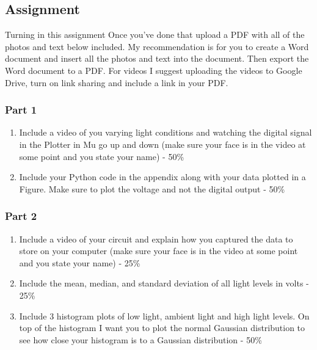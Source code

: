 \subsection{Assignment}

Turning in this assignment
Once you've done that upload a PDF with all of the photos and text below included. My recommendation is for you to create a Word document and insert all the photos and text into the document. Then export the Word document to a PDF. For videos I suggest uploading the videos to Google Drive, turn on link sharing and include a link in your PDF.

\subsubsection{Part 1}
\begin{enumerate}[itemsep=-5pt]
\item Include a video of you varying light conditions and watching the digital signal in the Plotter in Mu go up and down (make sure your face is in the video at some point and you state your name) - 50\%
\item Include your Python code in the appendix along with your data plotted in a Figure. Make sure to plot the voltage and not the digital output - 50\%
\end{enumerate}

\subsubsection{Part 2}
\begin{enumerate}[itemsep=-5pt]
\item Include a video of your circuit and explain how you captured the data to store on your computer (make sure your face is in the video at some point and you state your name) - 25\%
\item Include the mean, median, and standard deviation of all light levels in volts - 25\%
\item Include 3 histogram plots of low light, ambient light and high light levels. On top of the histogram I want you to plot the normal Gaussian distribution to see how close your histogram is to a Gaussian distribution  - 50\%
\end{enumerate}
